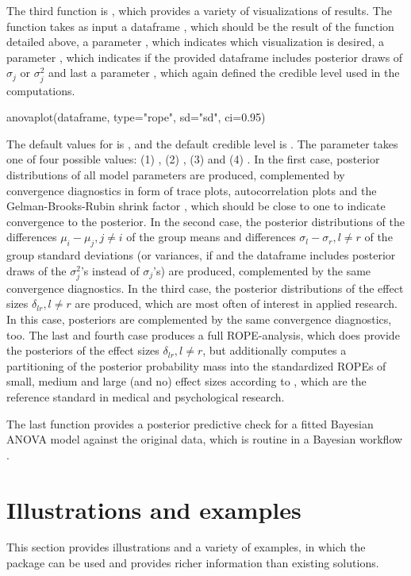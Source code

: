 The third function is , which provides a variety of visualizations of results. The function takes as input a dataframe , which should be the result of the  function detailed above, a parameter , which indicates which visualization is desired, a parameter , which indicates if the provided dataframe includes posterior draws of $\sigma_j$ or $\sigma_j^2$ and last a parameter , which again defined the credible level used in the computations.
\begin{example}
anovaplot(dataframe, type="rope", sd="sd", ci=0.95)
\end{example}
The default values for  is , and the default credible level is . The  parameter takes one of four possible values: (1) , (2) , (3)  and (4) . In the first case, posterior distributions of all model parameters are produced, complemented by convergence diagnostics in form of trace plots, autocorrelation plots and the Gelman-Brooks-Rubin shrink factor \citep{Gelman1998}, which should be close to one to indicate convergence to the posterior. In the second case, the posterior distributions of the differences $\mu_i-\mu_j, j\neq i$ of the group means and differences $\sigma_l-\sigma_r, l\neq r$ of the group standard deviations (or variances, if  and the dataframe includes posterior draws of the $\sigma_j^2$'s instead of $\sigma_j$'s) are produced, complemented by the same convergence diagnostics. In the third case, the posterior distributions of the effect sizes $\delta_{lr}, l\neq r$ are produced, which are most often of interest in applied research. In this case, posteriors are complemented by the same convergence diagnostics, too. The last and fourth case produces a full ROPE-analysis, which does provide the posteriors of the effect sizes $\delta_{lr}, l\neq r$, but additionally computes a partitioning of the posterior probability mass into the standardized ROPEs of small, medium and large (and no) effect sizes according to \cite{cohen_statistical_1988}, which are the reference standard in medical and psychological research.

The last function  provides a posterior predictive check for a fitted Bayesian ANOVA model against the original data, which is routine in a Bayesian workflow \cite{Gabry2019}.


\section{Illustrations and examples}
This section provides illustrations and a variety of examples, in which the  package can be used and provides richer information than existing solutions.

